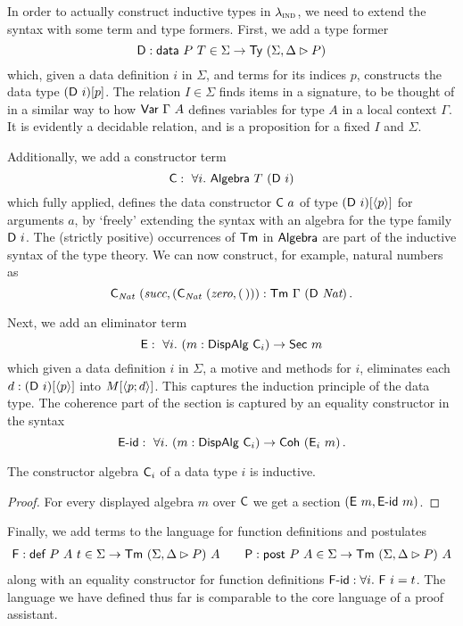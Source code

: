 In order to actually construct inductive types in $\lambda_{\textsc{ind}}$, we need to
extend the syntax with some term and type formers. First, we add a type former
\[
	\mta{D} : \mta{data}\ P\ T \in \Sigma \to \Ty\ (\Sigma, \Delta \rhd P)
\]
which, given a data definition $i$ in $\Sigma$, and terms for its
indices $p$, constructs the data type $(\mta{D}\ i)[p]$. The relation $I \in
\Sigma$ finds items in a signature, to be thought of in a similar way to how
$\mta{Var}\ \Gamma\ A$ defines variables for type $A$ in a local context
$\Gamma$. It is evidently a decidable relation, and is a proposition for a fixed
$I$ and $\Sigma$.

Additionally, we add a constructor term
\[
	\mta{C} :\ \forall i.\ \mta{Algebra}\ T\ (\mta{D}\ i)
\]
which fully applied, defines the data constructor $\textsf{C}\ a$ of type
$(\textsf{D}\ i)[\langle p\rangle]$ for arguments $a$, by `freely' extending the syntax with
an algebra for the type family $\textsf{D}\ i$. The (strictly positive) occurrences
of $\textsf{Tm}$ in $\textsf{Algebra}$ are part of the inductive syntax of the type
theory. We can now construct, for example, natural numbers as
\[
    \mta{C}_{\textit{Nat}}\ (\textit{succ}, (\mta{C}_{\textit{Nat}}\ (\textit{zero}, (\,))) : \mta{Tm}\ \Gamma\ (\mta{D}\ \textit{Nat}) \,.
\]

Next, we add an eliminator term
\[
	\textsf{E} :\ \forall i.\ (m : \textsf{DispAlg}\ \textsf{C}_i) \to \textsf{Sec}\ m
\]
which given a data definition $i$ in $\Sigma$, a motive and methods for $i$,
eliminates each $d : (\textsf{D}\ i)[\langle p\rangle]$ into $M[\langle p;d\rangle]$. This captures
the induction principle of the data type. The coherence part of the section is
captured by an equality constructor in the syntax
\[
	\mta{E-id} :\ \forall i.\ (m : \mta{DispAlg}\ \mta{C}_i) \to \mta{Coh}\ (\mta{E}_i\ m) \,.
\]
\begin{lemma}
	The constructor algebra $\textsf{C}_i$ of a data type $i$ is inductive.
	\begin{proof}
		For every displayed algebra $m$ over $\textsf{C}$ we get a section $(\textsf{E}\ m, \textsf{E-id}\ m)$.
	\end{proof}
\end{lemma}

Finally, we add terms to the language for function definitions and postulates
\begin{align*}
	\mta{F} : \mta{def}\ P\ A\ t \in \Sigma \to \Tm\ (\Sigma, \Delta \rhd P)\ A \qquad \mta{P} : \mta{post}\ P\ A \in \Sigma \to \Tm\ (\Sigma, \Delta \rhd P)\ A
\end{align*}
along with an equality constructor for function definitions $\mta{F-id} : \forall i.\ \mta{F}\ i = t$.
The language we have defined thus far is comparable to the core language of a
proof assistant.

